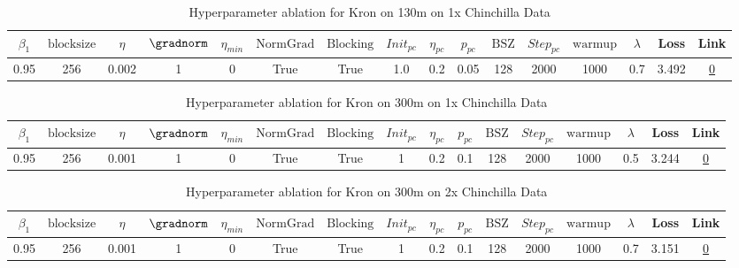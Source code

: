 \begin{table}[H]
\centering
\caption{Hyperparameter ablation for Kron on 130m on 1x Chinchilla Data}
\label{tab:ablation_kron_130m_1}
\begin{tabular}{cccccccccccccccc}
\toprule
$\beta_1$ & $\mathrm{block size}$ & $\eta$ & $\gradnorm$ & $\eta_{min}$ & $\mathrm{NormGrad}$ & $\mathrm{Blocking}$ & $Init_{pc}$ & $\eta_{pc}$ & $p_{pc}$ & $\mathrm{BSZ}$ & $Step_{pc}$ & $\mathrm{warmup}$ & $\lambda$ & Loss & Link \\
\midrule
0.95 & 256 & 0.002 & 1 & 0 & True & True & 1.0 & 0.2 & 0.05 & 128 & 2000 & 1000 & 0.7 & 3.492 & \href{https://wandb.ai/stanford-mercury/optimizer-scaling/runs/sweep-130m-2B-kron811b3clr0.002-wd0.7-b10.95-plr0.2-pis1-gn1-nor-45d11f}{0} \\
\midrule
\bottomrule
\end{tabular}
\end{table}

\begin{table}[H]
\centering
\caption{Hyperparameter ablation for Kron on 300m on 1x Chinchilla Data}
\label{tab:ablation_kron_300m_1}
\begin{tabular}{cccccccccccccccc}
\toprule
$\beta_1$ & $\mathrm{block size}$ & $\eta$ & $\gradnorm$ & $\eta_{min}$ & $\mathrm{NormGrad}$ & $\mathrm{Blocking}$ & $Init_{pc}$ & $\eta_{pc}$ & $p_{pc}$ & $\mathrm{BSZ}$ & $Step_{pc}$ & $\mathrm{warmup}$ & $\lambda$ & Loss & Link \\
\midrule
0.95 & 256 & 0.001 & 1 & 0 & True & True & 1 & 0.2 & 0.1 & 128 & 2000 & 1000 & 0.5 & 3.244 & \href{https://wandb.ai/stanford-mercury/optimizer-scaling/runs/sweep-300m-6B-kron9fb147lr0.001-wd0.5-b10.95-plr0.2-pis1-gn1-nor-d54c60}{0} \\
\midrule
\bottomrule
\end{tabular}
\end{table}

\begin{table}[H]
\centering
\caption{Hyperparameter ablation for Kron on 300m on 2x Chinchilla Data}
\label{tab:ablation_kron_300m_2}
\begin{tabular}{cccccccccccccccc}
\toprule
$\beta_1$ & $\mathrm{block size}$ & $\eta$ & $\gradnorm$ & $\eta_{min}$ & $\mathrm{NormGrad}$ & $\mathrm{Blocking}$ & $Init_{pc}$ & $\eta_{pc}$ & $p_{pc}$ & $\mathrm{BSZ}$ & $Step_{pc}$ & $\mathrm{warmup}$ & $\lambda$ & Loss & Link \\
\midrule
0.95 & 256 & 0.001 & 1 & 0 & True & True & 1 & 0.2 & 0.1 & 128 & 2000 & 1000 & 0.7 & 3.151 & \href{https://wandb.ai/stanford-mercury/optimizer-scaling/runs/sweep-300m-12B-kronb21812lr0.001-wd0.7-b10.95-plr0.2-pis1-gn1-no-48c292}{0} \\
\midrule
\bottomrule
\end{tabular}
\end{table}

